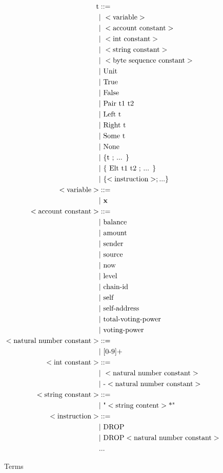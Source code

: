 \documentclass[runningheads]{llncs}
\begin{document}
\begin{figure}[h]
\begin{align*}
\text{t} &::= \\
   &\text{$\mid$}\ < \text{variable} > \\
   &\text{$\mid$}\ < \text{account constant} > \\
   &\text{$\mid$}\ < \text{int constant} > \\
   &\text{$\mid$}\ < \text{string constant} > \\
   &\text{$\mid$}\ < \text{byte sequence constant} > \\
   &\text{$\mid$}\ \text{Unit} \\
   &\text{$\mid$}\ \text{True} \\
   &\text{$\mid$}\ \text{False} \\
   &\text{$\mid$}\ \text{Pair}\ \text{t1 t2}\\
   &\text{$\mid$}\ \text{Left}\ \text{t}\\
   &\text{$\mid$}\ \text{Right}\ \text{t}\\ 
   &\text{$\mid$}\ \text{Some}\ \text{t}\\
   &\text{$\mid$}\ \text{None} \\
   &\text{$\mid$}\ \text{\{t ; ... \}}\\
   &\text{$\mid$}\ \text{\{ Elt t1 t2 ; ... \}}\\
   &\text{$\mid$}\ \{ <\text{instruction}>; ... \}   \\
< \text{variable} > &::= \\ 
   &\text{$\mid$}\ \textbf{x}\\
< \text{account constant} > &::= \\ 
   &\text{$\mid$}\ \text{balance} \\
   &\text{$\mid$}\ \text{amount} \\
   &\text{$\mid$}\ \text{sender} \\
   &\text{$\mid$}\ \text{source} \\
   &\text{$\mid$}\ \text{now} \\
   &\text{$\mid$}\ \text{level} \\
   &\text{$\mid$}\ \text{chain-id} \\
   &\text{$\mid$}\ \text{self}  \\
   &\text{$\mid$}\ \text{self-address}  \\
   &\text{$\mid$}\ \text{total-voting-power}  \\
   &\text{$\mid$}\ \text{voting-power}  \\
< \text{natural number constant} > &::= \\ 
   &\text{$\mid$}\ \text {[0-9]+} \\
< \text{int constant} > &::= \\
  &\text{$\mid$}\ < \text{natural number constant} > \\
  &\text{$\mid$}\ \text{-} < \text{natural number constant} > \\
<\text{string constant}> &::= \\
  &\text{$\mid$}\ \text{"} < \text{string content}>\text{*"} \\
<\text{instruction}> &::= \\
  &\text{$\mid$}\ \text{DROP} \\
  &\text{$\mid$}\ \text{DROP} <\text{natural number constant}> \\
  &\text{...}
\end{align*}
\caption{Terms}
\label{fig:term}
\end{figure}
\end{document}
